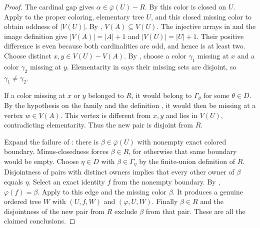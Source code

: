 \begin{proof}
The cardinal gap gives $\alpha\in\overline\varphi(U)-R$.
By  this color is closed on $U$.
Apply  to the proper
coloring, elementary tree $U$, and this closed missing color to obtain
oddness of $|V(U)|$.
By ,
$V(A)\subseteq V(U)$. The injective arrays in 
and the image definition  give
$|V(A)|=|A|+1$ and $|V(U)|=|U|+1$. Their positive difference is even
because both cardinalities are odd, and hence is at least two.
Choose distinct $x,y\in V(U)-V(A)$. By
, choose a color
$\gamma_1$ missing at $x$ and a color $\gamma_2$ missing at $y$.
Elementarity in  says their
missing sets are disjoint, so $\gamma_1\ne\gamma_2$.

If a color missing at $x$ or $y$ belonged to $R$, it would belong to
$\Gamma_\theta$ for some $\theta\in D$. By the hypothesis on the family
and the definition , it would then be
missing at a vertex $w\in V(A)$. This vertex is different from $x,y$
and lies in $V(U)$, contradicting elementarity. Thus the new pair
is disjoint from $R$.

Expand the failure of : there is
$\beta\in\overline\varphi(U)$ with nonempty exact colored boundary.
Minus-closedness forces $\beta\in R$, for otherwise that same boundary
would be empty. Choose $\eta\in D$ with $\beta\in\Gamma_\eta$ by the
finite-union definition of $R$. Disjointness of pairs with distinct
owners implies that every other owner of $\beta$ equals $\eta$.
Select an exact identity $f$ from the nonempty boundary. By
, $\varphi(f)=\beta$.
Apply  to this edge and
the missing color $\beta$. It produces a genuine ordered tree $W$
with $(U,f,W)$ and
$(\varphi,U,W)$.
Finally $\beta\in R$ and the disjointness of the new pair from $R$
exclude $\beta$ from that pair. These are all the claimed conclusions.
\end{proof}
